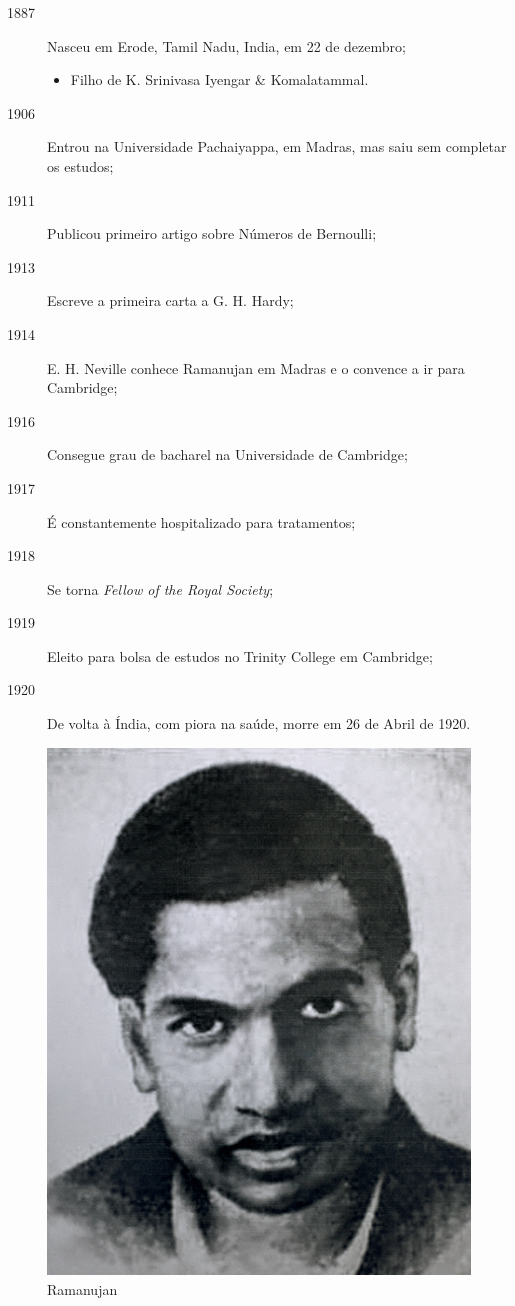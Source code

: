 \documentclass[12pt, a4paper]{article}
\begin{document}
\begin{description}
    \item[1887] Nasceu em Erode, Tamil Nadu, India, em 22 de dezembro;
    \begin{itemize}
        \item Filho de K. Srinivasa Iyengar \& Komalatammal.
    \end{itemize}
    \item[1906] Entrou na Universidade Pachaiyappa, em Madras, mas saiu sem 
                completar os estudos;
    \item[1911] Publicou primeiro artigo sobre Números de Bernoulli;
    \item[1913] Escreve a primeira carta a G. H. Hardy;
    \item[1914] E. H. Neville conhece Ramanujan em Madras e o convence a ir para 
                Cambridge;
    \item[1916] Consegue grau de bacharel na Universidade de Cambridge;
    \item[1917] É constantemente hospitalizado para tratamentos;
    \item[1918] Se torna \textit{Fellow of the Royal Society};
    \item[1919] Eleito para bolsa de estudos no Trinity College em Cambridge;
    \item[1920] De volta à Índia, com piora na saúde, morre em 26 de Abril de
                1920.
\end{description}

\begin{figure}[h!]
\caption{Ramanujan}\label{fig:ramanujan}
\centering
\includegraphics[scale=2.5]{ramanujan.png}
\end{figure}
\end{document}
